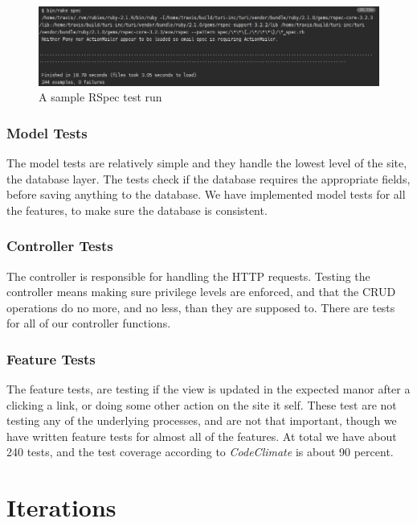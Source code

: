 \documentclass[a4paper]{article}
\begin{document}
\begin{figure}
  \begin{center}
    \includegraphics[scale=0.40]{pictures/rake_tests.png}
    \caption{A sample RSpec test run}
    \label{fig:}
  \end{center}
\end{figure}

\subsubsection{Model Tests}
The model tests are relatively simple and they handle the lowest level of the site, the database layer. The tests check if the database requires the appropriate fields, before saving anything to the database. We have implemented model tests for all the features, to make sure the database is consistent.
\\

\subsubsection{Controller Tests}
The controller is responsible for handling the HTTP requests. Testing the controller means making sure privilege levels are enforced, and that the CRUD operations do no more, and no less, than they are supposed to. There are tests for all of our controller functions.
\\

\subsubsection{Feature Tests}
The feature tests, are testing if the view is updated in the expected manor after a clicking a link, or doing some other action on the site it self. These test are not testing any of the underlying processes, and are not that important, though we have written feature tests for almost all of the features. 
At total we have about 240 tests, and the test coverage according to \textit{CodeClimate} is about 90 percent. \\

\section{Iterations}
\end{document}
